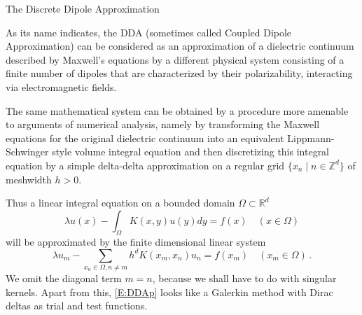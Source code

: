 \documentclass[12pt]{amsart}
\makeatletter
\def\subsection{\@startsection{section}{1}%
  \z@{1.2\linespacing\@plus\linespacing}{.5\linespacing}%
  {\normalfont\scshape\centering}}
\def\subsection{\@startsection{subsection}{2}%
  \z@{0.9\linespacing\@plus.7\linespacing}{-.5em}%
  {\normalfont\bfseries}}
\theoremstyle{definition}
\theoremstyle{remark}
\numberwithin{equation}{section}
\newcommand\R{{\mathbb R}}
\newcommand\Z{{\mathbb Z}}
\makeatother
\begin{document}
\subsection{The Discrete Dipole Approximation}\label{SS:DDA}\ 

As its name indicates, the DDA (sometimes called Coupled Dipole Approximation) can be considered as an approximation of a dielectric continuum described by Maxwell's equations by a different physical system consisting of a finite number of dipoles that are characterized by their polarizability, interacting via electromagnetic fields.  

The same mathematical system can be obtained by a procedure more amenable to arguments of numerical analysis, namely by transforming the Maxwell equations for the original dielectric continuum into an equivalent Lippmann-Schwinger style volume integral equation and then discretizing this integral equation by a simple delta-delta approximation on a regular grid
$\{x_{n}\mid n\in\Z^{d}\}$ of meshwidth $h>0$.

Thus a linear integral equation on a bounded domain $\Omega\subset\R^{d}$
\begin{equation}
\label{E:IE}
  \lambda u(x) - \int_{\Omega}K(x,y)u(y)dy = f(x) \quad(x\in\Omega)
\end{equation}
will be approximated by the finite dimensional linear system 
\begin{equation}
\label{E:DDAp}
  \lambda u_{m} - \sum_{x_{n}\in\Omega,n\ne m}h^{d}K(x_{m},x_{n})u_{n} = f(x_{m})
  \quad(x_{m}\in\Omega)\,.
\end{equation}
We omit the diagonal term $m=n$, because we shall have to do with singular kernels. Apart from this, \eqref{E:DDAp} looks like a Galerkin method with Dirac deltas as trial and test functions.
\end{document}
